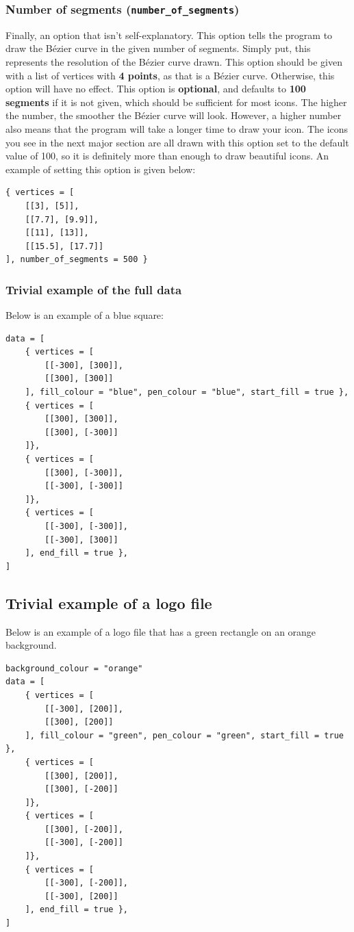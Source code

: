 \documentclass[11pt]{article}
\begin{document}
\subsubsection{Number of segments (\texttt{number\_of\_segments})}
\label{sec:org6150f6f}
Finally, an option that isn't self-explanatory. This option tells the program to draw the Bézier curve in the given number of segments. Simply put, this represents the resolution of the Bézier curve drawn. This option should be given with a list of vertices with \textbf{4 points}, as that is a Bézier curve. Otherwise, this option will have no effect. This option is \textbf{optional}, and defaults to \textbf{100 segments} if it is not given, which should be sufficient for most icons. The higher the number, the smoother the Bézier curve will look. However, a higher number also means that the program will take a longer time to draw your icon. The icons you see in the next major section are all drawn with this option set to the default value of 100, so it is definitely more than enough to draw beautiful icons. An example of setting this option is given below:

\begin{verbatim}
{ vertices = [
    [[3], [5]],
    [[7.7], [9.9]],
    [[11], [13]],
    [[15.5], [17.7]]
], number_of_segments = 500 }
\end{verbatim}

 \newpage

\subsubsection{Trivial example of the full data}
\label{sec:org590c867}
Below is an example of a blue square:
\begin{verbatim}
data = [
    { vertices = [
        [[-300], [300]],
        [[300], [300]]
    ], fill_colour = "blue", pen_colour = "blue", start_fill = true },
    { vertices = [
        [[300], [300]],
        [[300], [-300]]
    ]},
    { vertices = [
        [[300], [-300]],
        [[-300], [-300]]
    ]},
    { vertices = [
        [[-300], [-300]],
        [[-300], [300]]
    ], end_fill = true },
]
\end{verbatim}

 \newpage

\subsection{Trivial example of a logo file}
\label{sec:org9642796}
Below is an example of a logo file that has a green rectangle on an orange background.
\begin{verbatim}
background_colour = "orange"
data = [
    { vertices = [
        [[-300], [200]],
        [[300], [200]]
    ], fill_colour = "green", pen_colour = "green", start_fill = true },
    { vertices = [
        [[300], [200]],
        [[300], [-200]]
    ]},
    { vertices = [
        [[300], [-200]],
        [[-300], [-200]]
    ]},
    { vertices = [
        [[-300], [-200]],
        [[-300], [200]]
    ], end_fill = true },
]
\end{verbatim}
\end{document}
